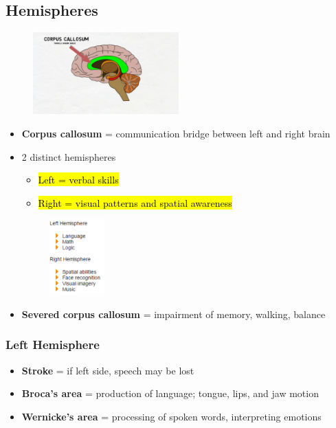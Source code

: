 \documentclass[a4paper,12pt]{article}
\begin{document}
\subsection{Hemispheres}
\begin{figure}[H]
    \centering
    \includegraphics[width=0.50\textwidth]{corpus}
\end{figure}
\begin{itemize}
    \item{\textbf{Corpus callosum} = communication bridge between left and right brain}
    \item{
            2 distinct hemispheres
            \begin{itemize}
                \item{\hl{Left = verbal skills}}
                \item{\hl{Right = visual patterns and spatial awareness}}
            \end{itemize}
            \begin{figure}[H]
                \centering
                \includegraphics[width=0.2\textwidth]{hemi}
            \end{figure}
        }
    \item{\textbf{Severed corpus callosum} = impairment of memory, walking, balance}
\end{itemize}
\subsubsection{Left Hemisphere}
\begin{itemize}
    \item{\textbf{Stroke} = if left side, speech may be lost}
    \item{\textbf{Broca's area} = production of language; tongue, lips, and jaw motion}
    \item{\textbf{Wernicke's area} = processing of spoken words, interpreting emotions}
\end{itemize}
\end{document}
